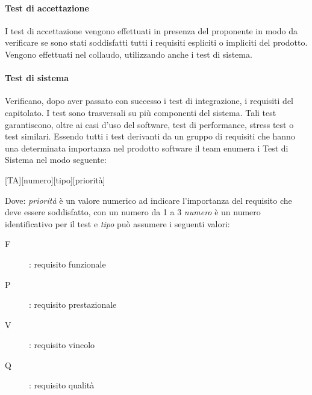 \documentclass[../../norme-di-progetto.tex]{subfiles}
\begin{document}
\paragraph{Test di accettazione}
I test di accettazione vengono effettuati in presenza del proponente in modo da verificare se sono stati soddisfatti tutti i requisiti espliciti o impliciti del prodotto.
Vengono effettuati nel collaudo, utilizzando anche i test di sistema.

\paragraph{Test di sistema}
Verificano, dopo aver passato con successo i test di integrazione, i requisiti del capitolato. I test sono trasversali su più componenti del sistema.
Tali test garantiscono, oltre ai casi d'uso del software, test di performance, stress test o test similari.
Essendo tutti i test derivanti da un gruppo di requisiti che hanno una determinata importanza nel prodotto software il team enumera i Test di Sistema nel modo seguente:
\begin{center}
    [TA][numero][tipo][priorità]
\end{center}
Dove: \textit{priorità} è un valore numerico ad indicare l'importanza del requisito che deve essere soddisfatto, con un numero da 1 a 3 \textit{numero} è un numero identificativo per il test e \textit{tipo} può assumere i seguenti valori:
\begin{description}
  \item [F]: requisito funzionale
  \item [P]: requisito prestazionale
  \item [V]: requisito vincolo
  \item [Q]: requisito qualità
\end{description}
\end{document}
